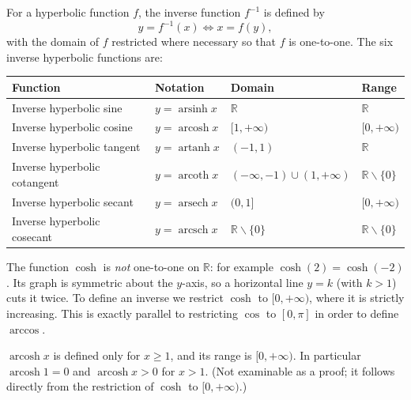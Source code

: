 \documentclass[11pt]{article}
\def\setminus{\mathbin{\backslash}}\let\smallsetminus\setminus
\begin{document}
\begin{definition}
For a hyperbolic function $f$, the inverse function $f^{-1}$ is defined by
\[
y = f^{-1}(x) \iff x = f(y),
\]
with the domain of $f$ restricted where necessary so that $f$ is one-to-one. The six inverse hyperbolic functions are:
\begin{center}
\begin{tabularx}{\linewidth}{|l|X|X|X|}
\hline
\rowcolor{popblueL} \textbf{Function} & \textbf{Notation} & \textbf{Domain} & \textbf{Range} \\
\hline
Inverse hyperbolic sine & $y = \operatorname{arsinh} x$ & $\mathbb{R}$ & $\mathbb{R}$ \\
\hline
Inverse hyperbolic cosine & $y = \operatorname{arcosh} x$ & $[1, +\infty)$ & $[0, +\infty)$ \\
\hline
Inverse hyperbolic tangent & $y = \operatorname{artanh} x$ & $(-1, 1)$ & $\mathbb{R}$ \\
\hline
Inverse hyperbolic cotangent & $y = \operatorname{arcoth} x$ & $(-\infty,-1)\cup(1,+\infty)$ & $\mathbb{R}\setminus\{0\}$ \\
\hline
Inverse hyperbolic secant & $y = \operatorname{arsech} x$ & $(0, 1]$ & $[0, +\infty)$ \\
\hline
Inverse hyperbolic cosecant & $y = \operatorname{arcsch} x$ & $\mathbb{R}\setminus\{0\}$ & $\mathbb{R}\setminus\{0\}$ \\
\hline
\end{tabularx}
\end{center}
\end{definition}

\begin{attention}
The function $\cosh$ is \emph{not} one-to-one on $\mathbb{R}$: for example $\cosh(2) = \cosh(-2)$. Its graph is symmetric about the $y$-axis, so a horizontal line $y = k$ (with $k > 1$) cuts it twice. To define an inverse we restrict $\cosh$ to $[0, +\infty)$, where it is strictly increasing. This is exactly parallel to restricting $\cos$ to $[0, \pi]$ in order to define $\arccos$.
\end{attention}

\begin{propriete}
$\operatorname{arcosh} x$ is defined only for $x \geq 1$, and its range is $[0, +\infty)$. In particular $\operatorname{arcosh} 1 = 0$ and $\operatorname{arcosh} x > 0$ for $x > 1$. (Not examinable as a proof; it follows directly from the restriction of $\cosh$ to $[0,+\infty)$.)
\end{propriete}
\end{document}
